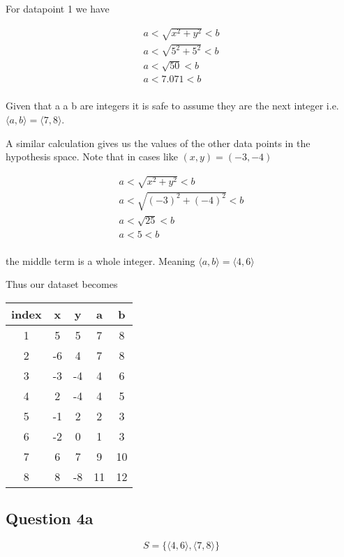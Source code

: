 \documentclass[10pt,a4paper]{article}
\begin{document}
For datapoint 1 we have 

\begin{equation}
\begin{split}
a < \sqrt{x^2 + y^2} < b \\
a < \sqrt{5^2 + 5^2} < b\\
a < \sqrt{50} < b\\ 
a < 7.071 < b \\
\end{split}
\end{equation}

Given that a a b are integers it is safe to assume they are the next integer i.e. $\langle a, b \rangle = \langle 7,8 \rangle$.

A similar calculation gives us the values of the other data points in the hypothesis space. Note that in cases like $(x,y) = (-3,-4)$

\begin{equation}
\begin{split}
a < \sqrt{x^2 + y^2} < b \\
a < \sqrt{(-3)^2 + (-4)^2} < b\\
a < \sqrt{25} < b\\ 
a < 5 < b \\
\end{split}
\end{equation}

the middle term is a whole integer. Meaning  $\langle a, b \rangle = \langle 4,6 \rangle$

Thus our dataset becomes
 
\begin{tabular}{|c|c|c|c|c|}
\hline
index & x & y & a & b\\
\hline
1 & 5 & 5 & 7 & 8\\
2 & -6 & 4 & 7 & 8\\
3 & -3 & -4 & 4&6\\
4 & 2  & -4 & 4&5\\
5 & -1 & 2 & 2&3\\
6 & -2 & 0 & 1&3\\
7 & 6  & 7 & 9&10\\
8 & 8  & -8 & 11&12\\
\hline
\end{tabular} 
 
\subsection{Question 4a} 
 
\begin{equation}
 S = \{ \langle 4,6 \rangle, \langle 7,8 \rangle \}
 \end{equation}
\end{document}
